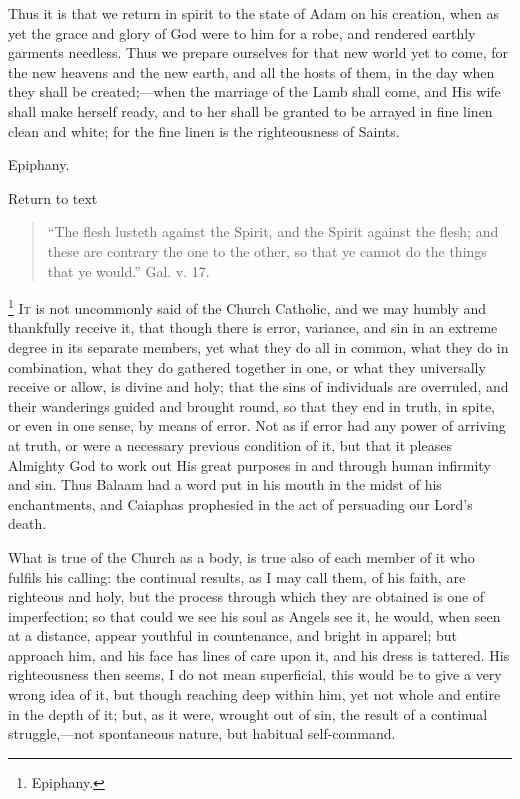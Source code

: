 Thus it is that we return in spirit to the state of Adam on his
creation, when as yet the grace and glory of God were to him for a
robe, and rendered earthly garments needless. Thus we prepare
ourselves for that new world yet to come, for the new heavens and the
new earth, and all the hosts of them, in the day when they shall be
created;—when the marriage of the Lamb shall come, and His wife
shall make herself ready, and to her shall be granted to be arrayed in
fine linen clean and white; for the fine linen is the righteousness of
Saints.


Epiphany.

Return to text


\begin{quote}

``The flesh lusteth against the Spirit, and the Spirit
against the flesh; and these are contrary the one to the other, so
that ye cannot do the things that ye would.'' Gal. v. 17.

\end{quote}

\footnote{Epiphany.} I\textsc{t} is not uncommonly
said of the Church Catholic, and we may humbly and thankfully receive
it, that though there is error, variance, and sin in an extreme degree
in its separate members, yet what they do all in common, what they do
in combination, what they do gathered together in one, or what they
universally receive or allow, is divine and holy; that the sins of
individuals are overruled, and their wanderings guided and brought
round, so that they end in truth, in spite, or even in one sense, by
means of error. Not as if error had any power of arriving at truth, or
were a necessary previous condition of it, but that it pleases
Almighty God to work out His great purposes in and through human
infirmity and sin. Thus Balaam had a word put in his mouth in the
midst of his enchantments, and Caiaphas prophesied in the act of
persuading our Lord's death.

What is true of the Church as a body, is true also of each member
of it who fulfils his calling: the continual results, as I may call
them, of his faith, are righteous and holy, but the process through
which they are obtained is one of imperfection; so that could we see
his soul as Angels see it, he would, when seen at a distance, appear
youthful in countenance, and bright in apparel; but approach him, and
his face has lines of care upon it, and his dress is tattered. His
righteousness then seems, I do not mean superficial, this would be to
give a very wrong idea of it, but though reaching deep within him, yet
not whole and entire in the depth of it; but, as it were, wrought out
of sin, the result of a continual struggle,—not spontaneous nature,
but habitual self-command.

